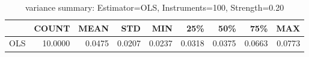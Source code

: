 \begin{table}[ht]
\centering
\caption{variance summary: Estimator=OLS, Instruments=100, Strength=0.20}
\begin{tabular}{lrrrrrrrr}
\toprule
 & COUNT & MEAN & STD & MIN & 25\% & 50\% & 75\% & MAX \\
\midrule
OLS & 10.0000 & 0.0475 & 0.0207 & 0.0237 & 0.0318 & 0.0375 & 0.0663 & 0.0773 \\
\bottomrule
\end{tabular}
\end{table}
